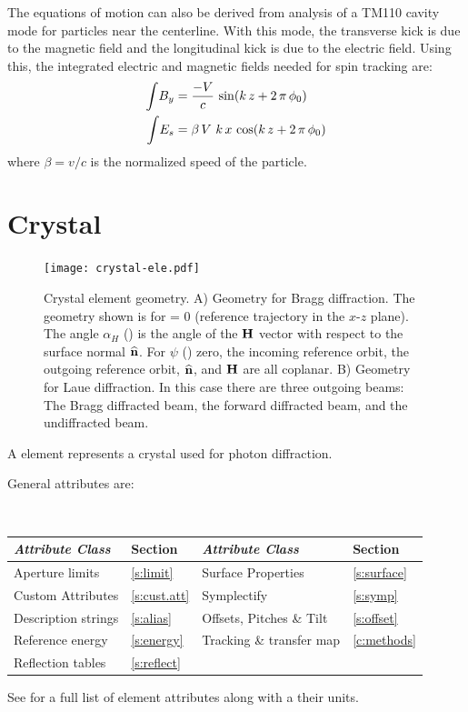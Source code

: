 The equations of motion can also be derived from analysis of a TM110 cavity mode for particles near
the centerline\cite{b:kim}. With this mode, the transverse kick is due to the magnetic field and the
longitudinal kick is due to the electric field. Using this, the integrated electric and magnetic
fields needed for spin tracking are:
\begin{align}
  \int \! B_y &= \frac{-V}{c} \, \sin(k \, z + 2 \, \pi \, \phi_0) \nonumber \\ 
  \int \! E_s &=  \beta \, V \, \, k \, x \, \cos(k \, z + 2 \, \pi \, \phi_0) 
\end{align}
where $\beta = v/c$ is the normalized speed of the particle.

\newpage

\section{Crystal}
\label{s:crystal}

\begin{figure}[tb]
  \centering
  \texttt{[image: crystal-ele.pdf]}
  \caption[Crystal element geometry.]
{Crystal element geometry.  A) Geometry for Bragg diffraction. The geometry shown is for
 = 0 (reference trajectory in the $x$-$z$ plane). The angle $\alpha_H$
() is the angle of the ${\bf H}$ vector with respect to the surface normal ${\widehat{\bf n}}$. For $\psi$ () zero, the incoming reference orbit, the outgoing reference orbit,
${\widehat{\bf n}}$, and ${\bf H}$ are all coplanar. B) Geometry for Laue diffraction. In this case there are
three outgoing beams: The Bragg diffracted beam, the forward diffracted beam, and the undiffracted
beam.}
  \label{f:crystal}
\end{figure}

A  element represents a crystal used for photon diffraction.

General  attributes are:
\begin{center}
\tt
\begin{tabular}{llll} \toprule
  {\sl Attribute Class}      & Section          & {\sl Attribute Class}      & Section         \\ \midrule
  Aperture limits            & \ref{s:limit}    & Surface Properties         & \ref{s:surface} \\ 
  Custom Attributes          & \ref{s:cust.att} & Symplectify                & \ref{s:symp}    \\
  Description strings        & \ref{s:alias}    & Offsets, Pitches \& Tilt   & \ref{s:offset}  \\
  Reference energy           & \ref{s:energy}   & Tracking \& transfer map   & \ref{c:methods} \\
  Reflection tables          & \ref{s:reflect}  &                            &                 \\
  \bottomrule
\end{tabular}
\end{center}
\toffset
See  for a full list of element attributes along with a their units.

